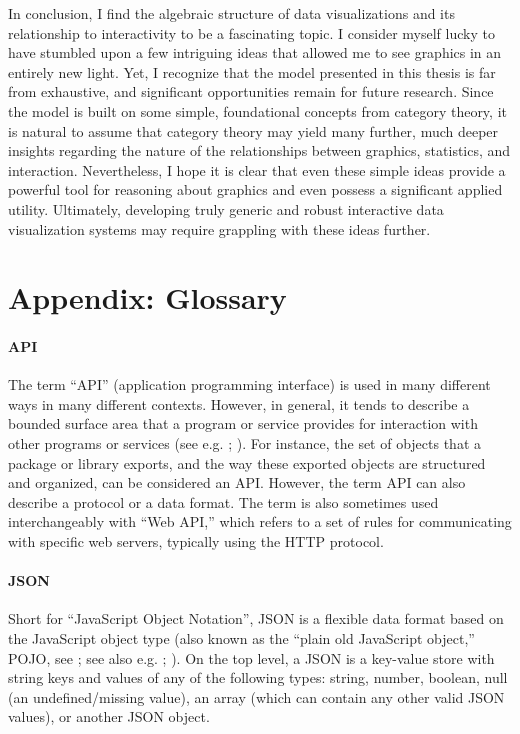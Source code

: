 \documentclass[
  openany]{book}
\theoremstyle{definition}
\theoremstyle{definition}
\theoremstyle{definition}
\theoremstyle{definition}
\theoremstyle{remark}
\begin{document}
In conclusion, I find the algebraic structure of data visualizations and its relationship to interactivity to be a fascinating topic. I consider myself lucky to have stumbled upon a few intriguing ideas that allowed me to see graphics in an entirely new light. Yet, I recognize that the model presented in this thesis is far from exhaustive, and significant opportunities remain for future research. Since the model is built on some simple, foundational concepts from category theory, it is natural to assume that category theory may yield many further, much deeper insights regarding the nature of the relationships between graphics, statistics, and interaction. Nevertheless, I hope it is clear that even these simple ideas provide a powerful tool for reasoning about graphics and even possess a significant applied utility. Ultimately, developing truly generic and robust interactive data visualization systems may require grappling with these ideas further.

\chapter{Appendix: Glossary}\label{appendix-glossary}

\subsubsection{API}\label{API}

The term ``API'' (application programming interface) is used in many different ways in many different contexts. However, in general, it tends to describe a bounded surface area that a program or service provides for interaction with other programs or services (see e.g. ; ). For instance, the set of objects that a package or library exports, and the way these exported objects are structured and organized, can be considered an API. However, the term API can also describe a protocol or a data format. The term is also sometimes used interchangeably with ``Web API,'' which refers to a set of rules for communicating with specific web servers, typically using the HTTP protocol.

\subsubsection{JSON}\label{JSON}

Short for ``JavaScript Object Notation'', JSON is a flexible data format based on the JavaScript object type (also known as the ``plain old JavaScript object,'' POJO, see ; see also e.g. ; ). On the top level, a JSON is a key-value store with string keys and values of any of the following types: string, number, boolean, null (an undefined/missing value), an array (which can contain any other valid JSON values), or another JSON object.
\end{document}
